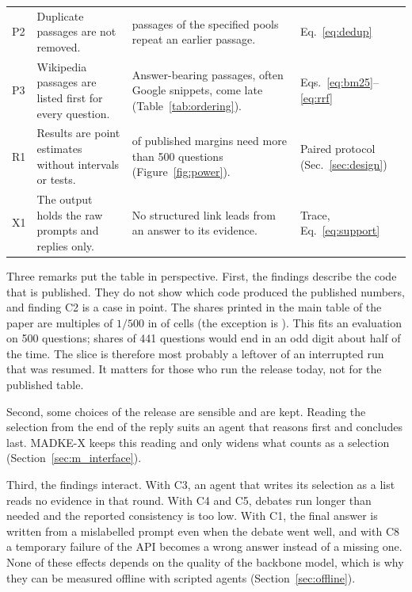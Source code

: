\begin{table}[!htbp]
\begin{tabular}{p{}>{\raggedright\arraybackslash}p{}>{\raggedright\arraybackslash}p{}>{\raggedright\arraybackslash}p{}}
P2 & Duplicate passages are not removed. & \VDupTotal{} passages of the specified pools repeat an earlier passage. & Eq.~\eqref{eq:dedup} \\
P3 & Wikipedia passages are listed first for every question. & Answer-bearing passages, often Google snippets, come late (Table~\ref{tab:ordering}). & Eqs.~\eqref{eq:bm25}--\eqref{eq:rrf} \\
\midrule
R1 & Results are point estimates without intervals or tests. & \VPowOver{} of \VPowN{} published margins need more than 500 questions (Figure~\ref{fig:power}). & Paired protocol (Sec.~\ref{sec:design}) \\
X1 & The output holds the raw prompts and replies only. & No structured link leads from an answer to its evidence. & Trace, Eq.~\eqref{eq:support} \\
\bottomrule
\end{tabular}
\end{table}

Three remarks put the table in perspective. First, the findings describe the code that is published. They do not show which code produced the published numbers, and finding C2 is a case in point. The shares printed in the main table of the paper are multiples of $1/500$ in \VPubMultiples{} of \VPubCells{} cells (the exception is \VPubOdd). This fits an evaluation on 500 questions; shares of 441 questions would end in an odd digit about half of the time. The slice is therefore most probably a leftover of an interrupted run that was resumed. It matters for those who run the release today, not for the published table.

Second, some choices of the release are sensible and are kept. Reading the selection from the end of the reply suits an agent that reasons first and concludes last. MADKE-X keeps this reading and only widens what counts as a selection (Section~\ref{sec:m_interface}).

Third, the findings interact. With C3, an agent that writes its selection as a list reads no evidence in that round. With C4 and C5, debates run longer than needed and the reported consistency is too low. With C1, the final answer is written from a mislabelled prompt even when the debate went well, and with C8 a temporary failure of the API becomes a wrong answer instead of a missing one. None of these effects depends on the quality of the backbone model, which is why they can be measured offline with scripted agents (Section~\ref{sec:offline}).
